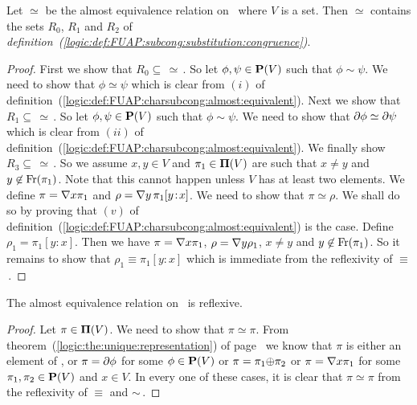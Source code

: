 \begin{prop}\label{logic:prop:FUAP:charsubcong:almost:contains:r0:r1:r2}
Let $\simeq$ be the almost equivalence relation on \pvs\ where $V$
is a set. Then $\simeq$ contains the sets $R_{0}$, $R_{1}$ and
$R_{2}$ of {\em
definition~(\ref{logic:def:FUAP:subcong:substitution:congruence})}.
\end{prop}
\begin{proof}
First we show that $R_{0}\subseteq\,\simeq$\,. So let
$\phi,\psi\in\mbox{${\bf P}(V)$}$ such that $\phi\sim\psi$. We need to show that
$\phi\simeq\psi$ which is clear from $(i)$ of
definition~(\ref{logic:def:FUAP:charsubcong:almost:equivalent}).
Next we show that $R_{1}\subseteq\,\simeq$\,. So let
$\phi,\psi\in\mbox{${\bf P}(V)$}$ such that $\phi\sim\psi$. We need to show that
$\mbox{$\partial$}\phi\simeq\mbox{$\partial$}\psi$ which is clear from $(ii)$ of
definition~(\ref{logic:def:FUAP:charsubcong:almost:equivalent}). We
finally show $R_{3}\subseteq\,\simeq$\,. So we assume $x,y\in V$ and
$\pi_{1}\in\mbox{${\bf\Pi}(V)$}$ are such that $x\neq y$ and
$y\not\in\mbox{\rm Fr}(\pi_{1})$. Note that this cannot happen unless $V$
has at least two elements. We define $\pi=\mbox{$\nabla$} x\pi_{1}$ and
$\rho=\mbox{$\nabla$} y\,\pi_{1}[y\!:\!x]$. We need to show that
$\pi\simeq\rho$. We shall do so by proving that $(v)$ of
definition~(\ref{logic:def:FUAP:charsubcong:almost:equivalent}) is
the case. Define $\rho_{1}=\pi_{1}[y\!:\!x]$. Then we have $\pi=\mbox{$\nabla$}
x\pi_{1}$, $\rho=\mbox{$\nabla$} y\rho_{1}$, $x\neq y$ and
$y\not\in\mbox{\rm Fr}(\pi_{1})$. So it remains to show that
$\rho_{1}\equiv\pi_{1}[y\!:\!x]$ which is immediate from the
reflexivity of $\equiv$\,.
\end{proof}

\begin{prop}\label{logic:prop:FUAP:subcong:almost:reflexive}
The almost equivalence relation on \pvs\ is reflexive.
\end{prop}
\begin{proof}
Let $\pi\in\mbox{${\bf\Pi}(V)$}$. We need to show that $\pi\simeq\pi$. From
theorem~(\ref{logic:the:unique:representation}) of
page~\pageref{logic:the:unique:representation} we know that $\pi$ is
either an element of \pv, or $\pi=\mbox{$\partial$}\phi$ for some $\phi\in\mbox{${\bf P}(V)$}$ or
$\pi=\pi_{1}\mbox{$\oplus$}\pi_{2}$ or $\pi=\mbox{$\nabla$} x\pi_{1}$ for some
$\pi_{1},\pi_{2}\in\mbox{${\bf P}(V)$}$ and $x\in V$. In every one of these cases,
it is clear that $\pi\simeq\pi$ from the reflexivity of $\equiv$ and
$\sim$\,.
\end{proof}

